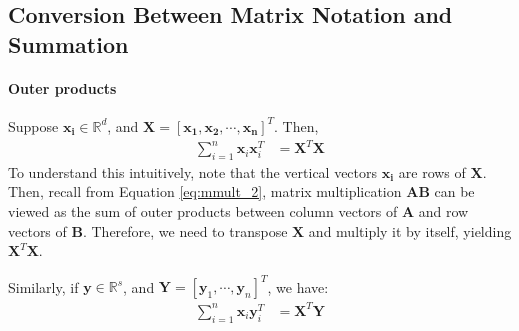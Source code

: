 
\subsection{Conversion Between Matrix Notation and Summation}
\paragraph{Outer products} Suppose $\bm{x_i}\in\mathbb{R}^d$, and $\bm{X}=[\bm{x_1},\bm{x_2},\cdots,\bm{x_n}]^T$. Then,
\begin{align}
    \sum_{i=1}^n\bm{x}_i\bm{x}_i^T&=\bm{X}^T\bm{X}
\end{align}
To understand this intuitively, note that the vertical vectors $\bm{x_i}$ are rows of $\bm{X}$. Then, recall from Equation \ref{eq:mmult_2}, matrix multiplication $\bm{AB}$ can be viewed as the sum of outer products between column vectors of $\bm{A}$ and row vectors of $\bm{B}$. Therefore, we need to transpose $\bm{X}$ and multiply it by itself, yielding $\bm{X}^T\bm{X}$.

Similarly, if $\bm{y}\in\mathbb{R}^s$, and $\bm{Y}=[\bm{y}_1,\cdots,\bm{y}_n]^T$, we have:
\begin{align}
    \sum_{i=1}^n\bm{x}_i\bm{y}_i^T&=\bm{X}^T\bm{Y}
\end{align}

